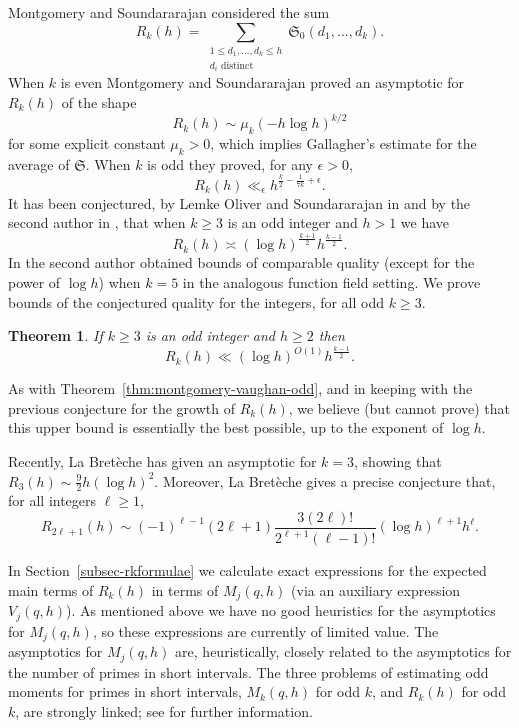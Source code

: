 \documentclass[11pt,letterpaper]{amsart}
\newtheorem{theorem}{Theorem}
\theoremstyle{definition}
\begin{document}
Montgomery and Soundararajan \cite{MS04} considered the sum
\[R_k(h) = \sum_{\substack{1\leq d_1,\ldots,d_k\leq h\\ d_i\textrm{ distinct}}}\mathfrak{S}_0(d_1,\ldots,d_k).\]
When $k$ is even 
Montgomery and Soundararajan \cite{MS04} proved an asymptotic for $R_k(h)$ of the shape
\[R_k(h)\sim \mu_k (-h \log h)^{k/2}\]
for some explicit constant $\mu_k>0$, which implies Gallagher's estimate for the average of $\mathfrak{S}$. When $k$ is odd they proved, for any $\epsilon>0$,
\[R_k(h) \ll_{\epsilon} h^{\frac{k}{2}-\frac{1}{7k}+\epsilon}.\]
It has been conjectured, by Lemke Oliver and Soundararajan in \cite{LOS16} and by the second author in \cite{K21}, that when $k\geq 3$ is an odd integer and $h>1$ we have
\[R_k(h) \asymp (\log h)^{\frac{k+1}{2}}h^{\frac{k-1}{2}}.\]
In \cite{K21} the second author obtained bounds of comparable quality (except for the power of $\log h$) when $k=5$ in the analogous function field setting. We prove bounds of the conjectured quality for the integers, for all odd $k\geq 3$.
\begin{theorem}\label{thm:conjecture-for-Rkh-for-k-odd}
If $k\geq 3$ is an odd integer and $h \ge 2$ then
\[R_k(h)\ll (\log h)^{O(1)} h^{\frac{k-1}{2}}.\]
\end{theorem}

As with Theorem~\ref{thm:montgomery-vaughan-odd}, and in keeping with the previous conjecture for the growth of $R_k(h)$, we believe (but cannot prove) that this upper bound is essentially the best possible, up to the exponent of $\log h$. 


Recently, La Bret\`eche \cite{dlB-3rd-moment} has given an asymptotic for $k=3$, showing that $R_3(h) \sim \frac 92 h (\log h)^2$. Moreover, La Bret\`{e}che gives a precise conjecture that, for all integers $\ell\geq 1$,
\[R_{2\ell+1}(h)\sim (-1)^{\ell-1}(2\ell+1)\frac{3(2\ell)!}{2^{\ell+1}(\ell-1)!}(\log h)^{\ell+1}h^{\ell}.\]


In Section~\ref{subsec-rkformulae} we calculate exact expressions for the expected main terms of $R_k(h)$ in terms of $M_j(q,h)$ (via an auxiliary expression $V_j(q,h)$). As mentioned above we have no good heuristics for the asymptotics for $M_j(q,h)$, so these expressions are currently of limited value. The asymptotics for $M_j(q,h)$ are, heuristically, closely related to the asymptotics for the number of primes in short intervals. The three problems of estimating odd moments for primes in short intervals, $M_k(q,h)$ for odd $k$, and $R_k(h)$ for odd $k$, are strongly linked; see \cite{dlB-3rd-moment} for further information.
\end{document}
